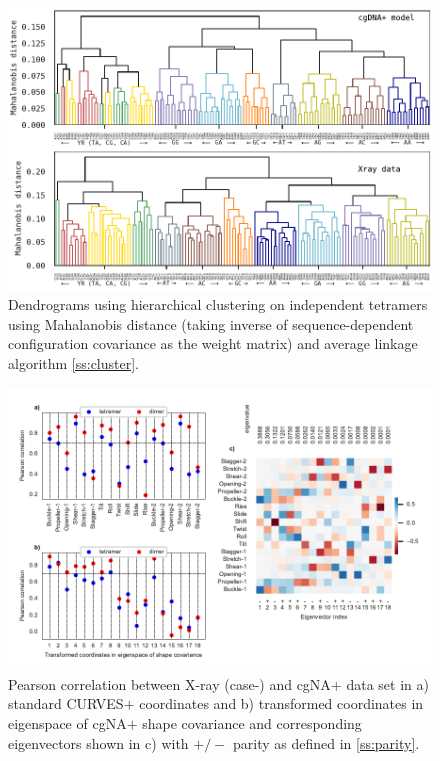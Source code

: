 \begin{figure}[H]
	\begin{center}
	\includegraphics[scale=1]{./Xray_images/Dendrogram_cgxray_X2.pdf}
	\caption{Dendrograms using hierarchical clustering on independent tetramers using Mahalanobis distance (taking inverse of sequence-dependent configuration covariance as the weight matrix) and average linkage algorithm \cref{ss:cluster}.  %
	}
\label{SIfig:cluster}
\end{center}
\end{figure}

\begin{figure}[H]
	\begin{center}
	\includegraphics[scale=0.9]{./Xray_images/X2_CG_256_PC_one_one.pdf}
	\caption{Pearson correlation between X-ray (case-) and cgNA$+$ data set in a) standard CURVES$+$ coordinates and b) transformed coordinates in eigenspace of cgNA$+$ shape covariance and corresponding eigenvectors shown in c) with $+/-$ parity as defined in \cref{ss:parity}.
	}
\label{SIfig:PC_one_one}
\end{center}
\end{figure}

